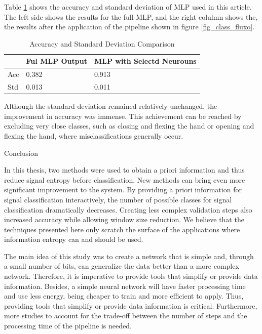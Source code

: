\documentclass[a4paper, 12pt]{ppgeb}
\makeatletter
\renewcommand{\section}{\@startsection
{section}
{1}
{0mm}
{-\baselineskip}
{0.5\baselineskip}
{\large\bfseries\scshape}}
\makeatother
\begin{document}
Table \ref{acc_std} shows the accuracy and standard deviation of \ac{MLP} used in this article. The left side shows the results for the full \ac{MLP}, and the right colulmn shows the, the results after the application of the pipeline shown in figure \ref{fig_class_fluxo}.

\begin{table}[h]
	\caption{Accuracy and Standard Deviation Comparison}
	\label{acc_std}
	\begin{center}
		\begin{tabular}{lll}
        \hline
                & Ful \ac{MLP} Output & \ac{MLP} with Selectd Neurouns \\ \hline
            Acc & 0.382          & 0.913                     \\
            Std & 0.013          & 0.011                     \\ \bottomrule
        \end{tabular}
	\end{center}
\end{table}

Although the standard deviation remained relatively unchanged, the improvement in accuracy was immense. This achievement can be reached by excluding very close classes, such as closing and flexing the hand or opening and flexing the hand, where misclassifications generally occur.

\section{Conclusion}

In this thesis, two methods were used to obtain a priori information and thus reduce signal entropy before classification. New methods can bring even more significant improvement to the system. By providing a priori information for signal classification interactively, the number of possible classes for signal classification dramatically decreases. Creating less complex validation steps also increased accuracy while allowing window size reduction. We believe that the techniques presented here only scratch the surface of the applications where information entropy can and should be used.

The main idea of this study was to create a network that is simple and, through a small number of bits, can generalize the data better than a more complex network. Therefore, it is imperative to provide tools that simplify or provide data information. Besides, a simple neural network will have faster processing time and use less energy, being cheaper to train and more efficient to apply. Thus, providing tools that simplify or provide data information is critical. Furthermore, more studies to account for the trade-off between the number of steps and the processing time of the pipeline is needed.
\end{document}
